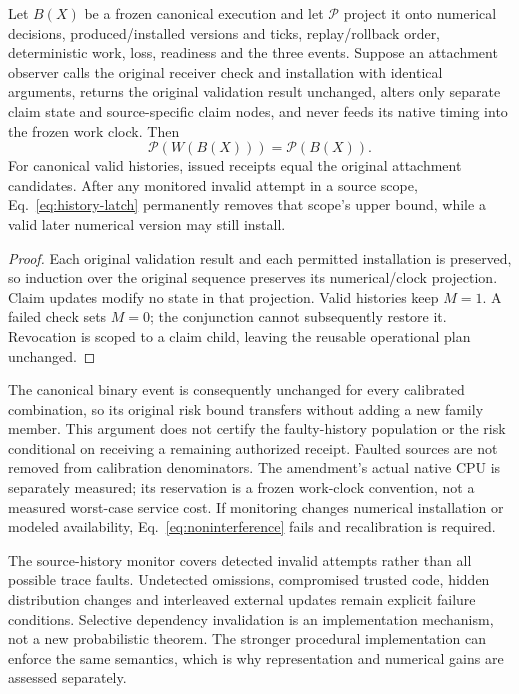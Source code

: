 \begin{proposition}\label{prop:attachment}
Let $B(X)$ be a frozen canonical execution and let $\mathcal P$ project it onto numerical decisions, produced/installed versions and ticks, replay/rollback order, deterministic work, loss, readiness and the three events. Suppose an attachment observer calls the original receiver check and installation with identical arguments, returns the original validation result unchanged, alters only separate claim state and source-specific claim nodes, and never feeds its native timing into the frozen work clock. Then
\begin{equation}
\mathcal P(W(B(X)))=\mathcal P(B(X)).\label{eq:noninterference}
\end{equation}
For canonical valid histories, issued receipts equal the original attachment candidates. After any monitored invalid attempt in a source scope, Eq.~\eqref{eq:history-latch} permanently removes that scope's upper bound, while a valid later numerical version may still install.
\end{proposition}
\begin{proof}
Each original validation result and each permitted installation is preserved, so induction over the original sequence preserves its numerical/clock projection. Claim updates modify no state in that projection. Valid histories keep $M=1$. A failed check sets $M=0$; the conjunction cannot subsequently restore it. Revocation is scoped to a claim child, leaving the reusable operational plan unchanged.
\end{proof}
The canonical binary event is consequently unchanged for every calibrated combination, so its original risk bound transfers without adding a new family member. This argument does not certify the faulty-history population or the risk conditional on receiving a remaining authorized receipt. Faulted sources are not removed from calibration denominators. The amendment's actual native CPU is separately measured; its reservation is a frozen work-clock convention, not a measured worst-case service cost. If monitoring changes numerical installation or modeled availability, Eq.~\eqref{eq:noninterference} fails and recalibration is required.

The source-history monitor covers detected invalid attempts rather than all possible trace faults. Undetected omissions, compromised trusted code, hidden distribution changes and interleaved external updates remain explicit failure conditions. Selective dependency invalidation is an implementation mechanism, not a new probabilistic theorem. The stronger procedural implementation can enforce the same semantics, which is why representation and numerical gains are assessed separately.
